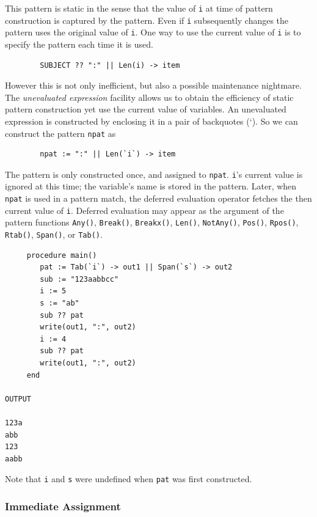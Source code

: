 \documentclass[letterpaper,12pt]{article}
\begin{document}
This pattern is static in the sense that the value of {\tt i} at
time of pattern construction is captured by the pattern. Even if
\texttt{i} subsequently changes the pattern uses the original value of
\texttt{i}. One way to use the current value of \texttt{i} is to
specify the pattern each time it is used.

\begin{verbatim}
        SUBJECT ?? ":" || Len(i) -> item
\end{verbatim}

However this is not only inefficient, but also a possible maintenance
nightmare. The {\em unevaluated expression\/} facility allows us to obtain
the efficiency of static pattern construction yet use the current
value of variables. An unevaluated expression is constructed by
enclosing it in a pair of backquotes (`). So we can construct the pattern
\texttt{npat} as

\begin{verbatim}
        npat := ":" || Len(`i`) -> item
\end{verbatim}

The pattern is only constructed once, and assigned to
\texttt{npat}. \texttt{i}'s current value is ignored at this
time; the variable's name is stored in the pattern.
Later, when \texttt{npat} is used in a pattern match, the
deferred evaluation operator fetches the then current value of
\texttt{i}. Deferred evaluation may appear as the argument of the
pattern functions {\tt Any()}, {\tt Break()}, {\tt Breakx()}, {\tt Len()},
{\tt NotAny()}, {\tt Pos()}, {\tt Rpos()}, {\tt Rtab()}, {\tt Span()},
or {\tt Tab()}.

\begin{verbatim}
     procedure main()
        pat := Tab(`i`) -> out1 || Span(`s`) -> out2
        sub := "123aabbcc"
        i := 5
        s := "ab"
        sub ?? pat
        write(out1, ":", out2)
        i := 4
        sub ?? pat
        write(out1, ":", out2)
     end

OUTPUT

123a
abb
123
aabb
\end{verbatim}

\noindent Note that \texttt{i} and \texttt{s} were undefined when \texttt{pat}
was first constructed.

\subsubsection{Immediate Assignment}
\end{document}
